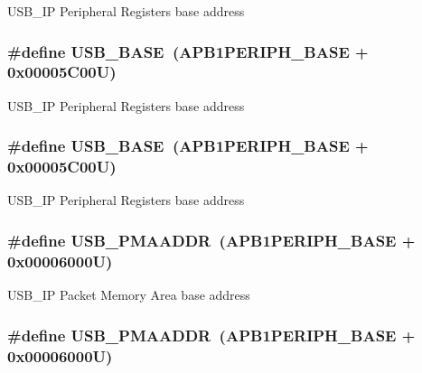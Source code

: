 U\-S\-B\-\_\-\-I\-P Peripheral Registers base address \hypertarget{group___peripheral__memory__map_gaa6c4cbed4ddbb3ecd77de93fab2a2e04}{
\subsubsection[{U\-S\-B\-\_\-\-B\-A\-S\-E}]{\setlength{\rightskip}{0pt plus 5cm}\#define U\-S\-B\-\_\-\-B\-A\-S\-E~(A\-P\-B1\-P\-E\-R\-I\-P\-H\-\_\-\-B\-A\-S\-E + 0x00005\-C00\-U)}}\label{group___peripheral__memory__map_gaa6c4cbed4ddbb3ecd77de93fab2a2e04}
U\-S\-B\-\_\-\-I\-P Peripheral Registers base address \hypertarget{group___peripheral__memory__map_gaa6c4cbed4ddbb3ecd77de93fab2a2e04}{
\subsubsection[{U\-S\-B\-\_\-\-B\-A\-S\-E}]{\setlength{\rightskip}{0pt plus 5cm}\#define U\-S\-B\-\_\-\-B\-A\-S\-E~(A\-P\-B1\-P\-E\-R\-I\-P\-H\-\_\-\-B\-A\-S\-E + 0x00005\-C00\-U)}}\label{group___peripheral__memory__map_gaa6c4cbed4ddbb3ecd77de93fab2a2e04}
U\-S\-B\-\_\-\-I\-P Peripheral Registers base address \hypertarget{group___peripheral__memory__map_gaf992dfdd5707568c5cb5506e2347e808}{
\subsubsection[{U\-S\-B\-\_\-\-P\-M\-A\-A\-D\-D\-R}]{\setlength{\rightskip}{0pt plus 5cm}\#define U\-S\-B\-\_\-\-P\-M\-A\-A\-D\-D\-R~(A\-P\-B1\-P\-E\-R\-I\-P\-H\-\_\-\-B\-A\-S\-E + 0x00006000\-U)}}\label{group___peripheral__memory__map_gaf992dfdd5707568c5cb5506e2347e808}
U\-S\-B\-\_\-\-I\-P Packet Memory Area base address \hypertarget{group___peripheral__memory__map_gaf992dfdd5707568c5cb5506e2347e808}{
\subsubsection[{U\-S\-B\-\_\-\-P\-M\-A\-A\-D\-D\-R}]{\setlength{\rightskip}{0pt plus 5cm}\#define U\-S\-B\-\_\-\-P\-M\-A\-A\-D\-D\-R~(A\-P\-B1\-P\-E\-R\-I\-P\-H\-\_\-\-B\-A\-S\-E + 0x00006000\-U)}}\label{group___peripheral__memory__map_gaf992dfdd5707568c5cb5506e2347e808}
